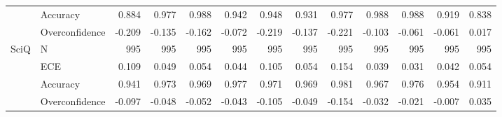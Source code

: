 \begin{table}
\begin{tabular}{llrrrrrrrrrrr}
 & Accuracy & 0.884 & 0.977 & 0.988 & 0.942 & 0.948 & 0.931 & 0.977 & 0.988 & 0.988 & 0.919 & 0.838 \\
 & Overconfidence & -0.209 & -0.135 & -0.162 & -0.072 & -0.219 & -0.137 & -0.221 & -0.103 & -0.061 & -0.061 & 0.017 \\
\cline{1-13}
\multirow[t]{4}{*}{SciQ} & N & 995 & 995 & 995 & 995 & 995 & 995 & 995 & 995 & 995 & 995 & 995 \\
 & ECE & 0.109 & 0.049 & 0.054 & 0.044 & 0.105 & 0.054 & 0.154 & 0.039 & 0.031 & 0.042 & 0.054 \\
 & Accuracy & 0.941 & 0.973 & 0.969 & 0.977 & 0.971 & 0.969 & 0.981 & 0.967 & 0.976 & 0.954 & 0.911 \\
 & Overconfidence & -0.097 & -0.048 & -0.052 & -0.043 & -0.105 & -0.049 & -0.154 & -0.032 & -0.021 & -0.007 & 0.035 \\
\cline{1-13}
\bottomrule
\end{tabular}
\end{table}
